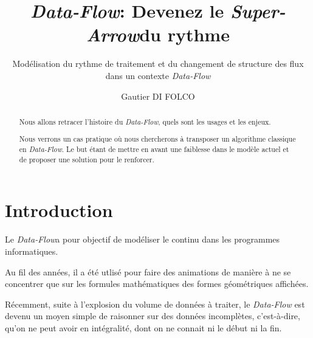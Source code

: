 \documentclass{llncs}
\newcommand{\DF}{\emph{Data-Flow}}
\newcommand{\SA}{\emph{Super-Arrow}}
\begin{document}
\title{\DF : Devenez le \SA du rythme}


\subtitle{Modélisation du rythme de traitement et du changement de structure des flux dans un contexte \DF}


\author{Gautier DI FOLCO}







\maketitle

\begin{abstract}
Nous allons retracer l'histoire du \DF, quels sont les usages et les enjeux.

Nous verrons un cas pratique où nous chercherons à transposer un algorithme
classique en \DF.
Le but étant de mettre en avant une faiblesse dans le modèle actuel et de
proposer une solution pour le renforcer.
\end{abstract}

\section{Introduction}
Le \DF a pour objectif de modéliser le continu dans les programmes informatiques.

Au fil des années, il a été utlisé pour faire des animations de manière à ne se
concentrer que sur les formules mathématiques des formes géométriques affichées.

Récemment, suite à l'explosion du volume de données à traiter, le \DF
est devenu un moyen simple de raisonner sur des données incomplètes, c'est-à-dire,
qu'on ne peut avoir en intégralité, dont on ne connait ni le début ni la fin.
\end{document}
